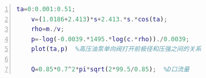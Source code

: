 \documentclass{cumcmthesis}
\begin{document}
\begin{appendices}
\begin{lstlisting}[language=matlab,numbers=left, numberstyle=\tiny]
    ta=0:0.001:0.51;
    v=(1.0186+2.413)*s+2.413.*s.*cos(ta);
    rho=m./v;
    p=-log(-0.0039.*1495.*log(c.*rho))./0.0039;
    plot(ta,p)  %高压油泵单向阀打开前极径和压强之间的关系
    
    Q=0.85*0.7^2*pi*sqrt(2*99.5/0.85);  %D口流量
 \end{lstlisting}
\end{appendices}
\end{document}
